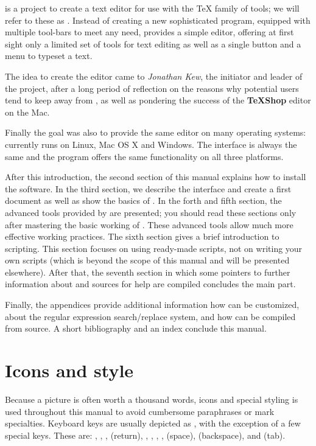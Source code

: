 \textbf{\Tw} is a project to create a text editor for use with the {\TeX} family of tools; we will refer to these as \AllTeX. Instead of creating a new sophisticated program, equipped with multiple tool-bars to meet any need, {\Tw} provides a simple editor, offering at first sight only a limited set of tools for text editing as well as a single button and a menu to typeset a {\AllTeX} text.

The idea to create the editor came to \emph{Jonathan Kew}, the initiator and leader of the project, after a long period of reflection on the reasons why potential users tend to keep away from \AllTeX, as well as pondering the success of the \textbf{{\TeX}Shop} editor on the Mac.

Finally the goal was also to provide the same editor on many operating systems: {\Tw} currently runs on Linux, Mac OS X and Windows. The interface is always the same and the program offers the same functionality on all three platforms.

After this introduction, the second section of this manual explains how to install the software. In the third section, we describe the interface and create a first document as well as show the basics of {\Tw}. In the forth and fifth section, the advanced tools provided by {\Tw} are presented; you should read these sections only after mastering the basic working of {\Tw}. These advanced tools allow much more effective working practices. The sixth section gives a brief introduction to scripting. This section focuses on using ready-made scripts, not on writing your own scripts (which is beyond the scope of this manual and will be presented elsewhere). After that, the seventh section in which some pointers to further information about {\Tw} and sources for help are compiled concludes the main part.

Finally, the appendices provide additional information how {\Tw} can be customized, about the regular expression search/replace system, and how {\Tw} can be compiled from source. A short bibliography and an index conclude this manual.

\section{Icons and style}

Because a picture is often worth a thousand words, icons and special styling is used throughout this manual to avoid cumbersome paraphrases or mark specialties. Keyboard keys are usually depicted as , with the exception of a few special keys. These are:
, , ,  (return), , , , ,  (space),  (backspace), and  (tab).

